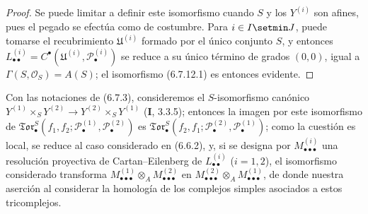 \begin{proof}
Se puede limitar a definir este isomorfismo cuando $S$ y los $Y^{(i)}$ son
afines, pues el pegado se efectúa como de costumbre. Para $i\in I\setmin J$, puede
tomarse el recubrimiento $\mathfrak U^{(i)}$ formado por el único conjunto $S$,
y entonces
$L_{\bullet\bullet}^{(i)}=C^\bullet(\mathfrak U^{(i)},
\mathscr P_\bullet^{(i)})$ se reduce a su único término de grados $(0,0)$,
igual a $\Gamma(S,\mathscr O_S)=A(S)$; el isomorfismo (6.7.12.1) es entonces
evidente.
\end{proof}

\begin{remark}[6.7.13]
\label{III.6.7.13}
Con las notaciones de (6.7.3), consideremos el $S$-isomorfismo canónico
$Y^{(1)}\times_S Y^{(2)}\to Y^{(2)}\times_S Y^{(1)}$ (\textbf I, 3.3.5); entonces la
imagen por este isomorfismo de
$\mathfrak{Tor}_\bullet^S(f_1,f_2;
\mathscr P_\bullet^{(1)},\mathscr P_\bullet^{(2)})$ es
$\mathfrak{Tor}_\bullet^S(f_2,f_1;
\mathscr P_\bullet^{(2)},\mathscr P_\bullet^{(1)})$; como la cuestión es
local, se reduce al caso considerado en (6.6.2), y, si se designa por
$M_{\bullet\bullet\bullet}^{(i)}$ una resolución proyectiva de
Cartan--Eilenberg de $L_{\bullet\bullet}^{(i)}$ ($i=1,2$), el isomorfismo
considerado transforma
$M_{\bullet\bullet\bullet}^{(1)}\otimes_A
M_{\bullet\bullet\bullet}^{(2)}$ en
$M_{\bullet\bullet\bullet}^{(2)}\otimes_A
M_{\bullet\bullet\bullet}^{(1)}$, de donde nuestra aserción al considerar la homología de los complejos simples asociados a estos tricomplejos.
\end{remark}
